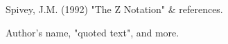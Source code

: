 \documentclass[a4paper,10pt,fleqn]{article}
\begin{document}
\bigskip

Spivey, J.M. (1992) "The Z Notation" \& references.

\bigskip

\bigskip

Author's name, "quoted text", and more.

\bigskip
\end{document}
